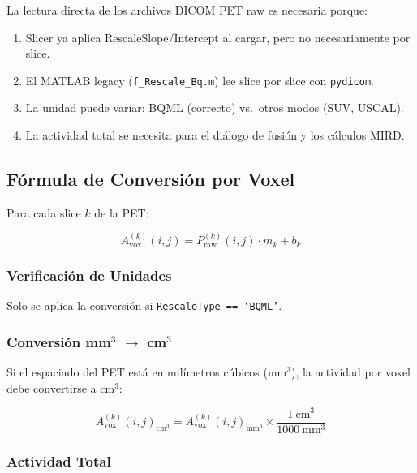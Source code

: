 \documentclass[12pt,a4paper]{article}
\begin{document}
La lectura directa de los archivos DICOM PET raw es necesaria porque:
\begin{enumerate}
  \item Slicer ya aplica RescaleSlope/Intercept al cargar, pero no necesariamente por slice.
  \item El MATLAB legacy (\texttt{f\_Rescale\_Bq.m}) lee slice por slice con \texttt{pydicom}.
  \item La unidad puede variar: BQML (correcto) vs.\ otros modos (SUV, USCAL).
  \item La actividad total se necesita para el diálogo de fusión y los cálculos MIRD.
\end{enumerate}

\subsection{Fórmula de Conversión por Voxel}

Para cada slice $k$ de la PET:

$$A_{\text{vox}}^{(k)}(i,j) = P_{\text{raw}}^{(k)}(i,j) \cdot m_k + b_k$$


\subsubsection{Verificación de Unidades}

Solo se aplica la conversión si \texttt{RescaleType == `BQML'}.

\subsubsection{Conversión mm$^3$ $\to$ cm$^3$}

Si el espaciado del PET está en milímetros cúbicos (mm$^3$), la actividad por voxel debe convertirse a cm$^3$:

$$A_{\text{vox}}^{(k)}(i,j)_{\text{cm}^3} = A_{\text{vox}}^{(k)}(i,j)_{\text{mm}^3} \times \frac{1\ \text{cm}^3}{1000\ \text{mm}^3}$$

\subsubsection{Actividad Total}
\end{document}
